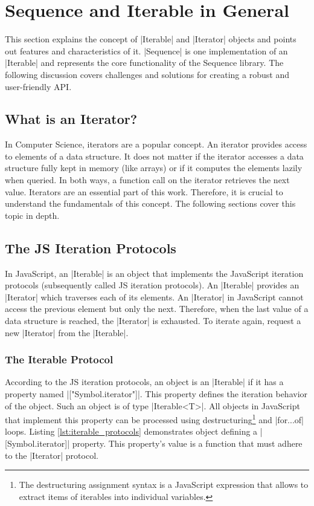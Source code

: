 \section{Sequence and Iterable in General}
\label{sec:Sequence and Iterable in General}
This section explains the concept of |Iterable| and |Iterator| objects and points
out features and characteristics of it. |Sequence| is one implementation of
an |Iterable| and represents the core functionality of the Sequence library. The following
discussion covers challenges and solutions for creating a robust and
user-friendly API.

\subsection{What is an Iterator?}
\label{sub:What is an Iterator?}
In Computer Science, iterators are a popular concept. An iterator provides
access to elements of a data structure. It does not matter if the iterator
accesses a data structure fully kept in memory (like arrays) or if it computes
the elements lazily when queried. In both ways, a function call on the iterator
retrieves the next value. Iterators are an essential part of this work.
Therefore, it is crucial to understand the fundamentals of this concept. The
following sections cover this topic in depth.

\subsection{The JS Iteration Protocols}
\label{sub:Exploring the Meaning of Protocols}
In JavaScript, an |Iterable| is an object that implements the JavaScript
iteration protocols \cite{mdn_protocols} (subsequently called JS
iteration protocols). An |Iterable| provides an |Iterator| which traverses
each of its elements. An |Iterator| in JavaScript cannot access the previous
element but only the next. Therefore, when the last value of a data
structure is reached, the |Iterator| is exhausted. To iterate again, request a
new |Iterator| from the |Iterable|.

\subsubsection{The Iterable Protocol}
\label{subsub:The Iterable Protocol}
According to the JS iteration protocols, an object is an |Iterable| if it has a
property named |["Symbol.iterator"]|. This property defines the iteration
behavior of the object. Such an object is of type |Iterable<T>|. All objects in
JavaScript that implement this property can be processed using
destructuring\footnote{The destructuring assignment syntax is a JavaScript
expression that allows to extract items of iterables into individual
variables.} and |for...of| loops. Listing \ref{lst:iterable_protocols}
demonstrates object defining a |[Symbol.iterator]| property. This
property's value is a function that must adhere to the |Iterator| protocol.

